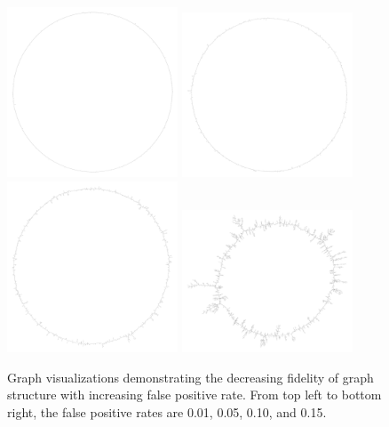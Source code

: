 \documentclass{pnastwo}
\begin{document}
\begin{figure}
\includegraphics[width=2in]{figures/f3b001}
\includegraphics[width=2in]{figures/f3b005}
\includegraphics[width=2in]{figures/f3b010}
\includegraphics[width=2in]{figures/f3b015}
\caption{Graph visualizations demonstrating the decreasing 
fidelity of graph structure with increasing false positive rate. From 
top left to bottom right, the false positive rates are 0.01, 0.05, 0.10, 
and 0.15.}
\label{fig:circles}
\end{figure}
\end{document}
